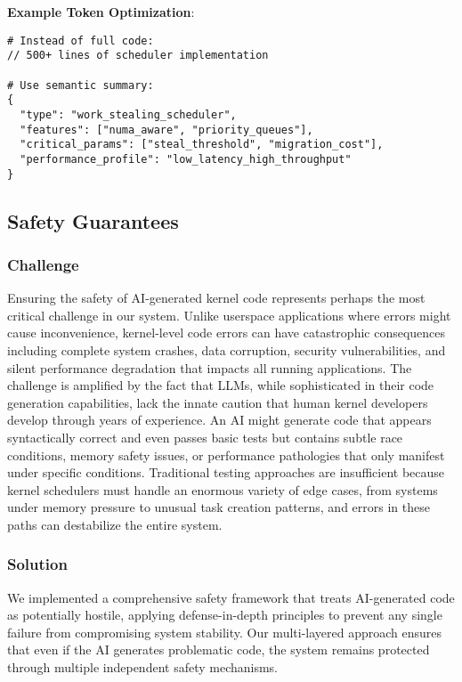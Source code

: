 \textbf{Example Token Optimization}:
\begin{verbatim}
# Instead of full code:
// 500+ lines of scheduler implementation

# Use semantic summary:
{
  "type": "work_stealing_scheduler",
  "features": ["numa_aware", "priority_queues"],
  "critical_params": ["steal_threshold", "migration_cost"],
  "performance_profile": "low_latency_high_throughput"
}
\end{verbatim}

\subsection{Safety Guarantees}

\subsubsection{Challenge}
Ensuring the safety of AI-generated kernel code represents perhaps the most critical challenge in our system. Unlike userspace applications where errors might cause inconvenience, kernel-level code errors can have catastrophic consequences including complete system crashes, data corruption, security vulnerabilities, and silent performance degradation that impacts all running applications. The challenge is amplified by the fact that LLMs, while sophisticated in their code generation capabilities, lack the innate caution that human kernel developers develop through years of experience. An AI might generate code that appears syntactically correct and even passes basic tests but contains subtle race conditions, memory safety issues, or performance pathologies that only manifest under specific conditions. Traditional testing approaches are insufficient because kernel schedulers must handle an enormous variety of edge cases, from systems under memory pressure to unusual task creation patterns, and errors in these paths can destabilize the entire system.

\subsubsection{Solution}
We implemented a comprehensive safety framework that treats AI-generated code as potentially hostile, applying defense-in-depth principles to prevent any single failure from compromising system stability. Our multi-layered approach ensures that even if the AI generates problematic code, the system remains protected through multiple independent safety mechanisms.

